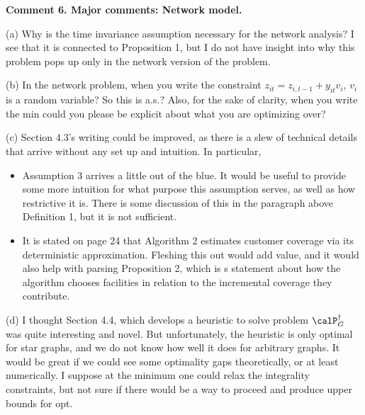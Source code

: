 \documentclass[11pt]{article}
\begin{document}
\begin{commentBox}
\textbf{Comment 6. Major comments: Network model.}\label{AE:6}

(a) Why is the time invariance assumption necessary for the network analysis? I see that it is connected to Proposition 1, but I do not have insight into why this problem pops up only in the network version of the problem.

(b) In the network problem, when you write the constraint $z_{it}=z_{i,t-1}+y_{it}v_i$, $v_i$ is a random variable? So this is a.s.? Also, for the sake of clarity, when you write the min could you please be explicit about what you are optimizing over?

(c) Section 4.3's writing could be improved, as there is a slew of technical details that arrive without any set up and intuition. In particular,
\begin{itemize}
    \item[i.] Assumption 3 arrives a little out of the blue. It would be useful to provide some more intuition for what purpose this assumption serves, as well as how restrictive it is. There is some discussion of this in the paragraph above Definition 1, but it is not sufficient.
    \item[ii.] It is stated on page 24 that Algorithm 2 estimates customer coverage via its deterministic approximation. Fleshing this out would add value, and it would also help with parsing Proposition 2, which is s statement about how the algorithm chooses facilities in relation to the incremental coverage they contribute.
\end{itemize}

(d) I thought Section 4.4, which develops a heuristic to solve problem $\calP_G^\dagger$ was quite interesting and novel. But unfortunately, the heuristic is only optimal for star graphs, and we do not know how well it does for arbitrary graphs. It would be great if we could see some optimality gaps theoretically, or at least numerically. I suppose at the minimum one could relax the integrality constraints, but not sure if there would be a way to proceed and produce upper bounds for opt.
\end{commentBox}
\end{document}
